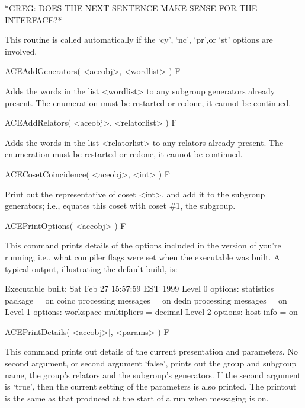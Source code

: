 *GREG: DOES THE NEXT SENTENCE MAKE SENSE FOR THE INTERFACE?*

This routine is  called automatically if the `cy',  `nc', `pr',or `st'
options are involved.


\>ACEAddGenerators( <aceobj>, <wordlist> ) F

Adds the words in the list <wordlist> to any subgroup generators already
present.
The enumeration must be restarted or redone, it cannot be continued.

\>ACEAddRelators( <aceobj>, <relatorlist> ) F

Adds the words in the list <relatorlist> to any relators already present.
The enumeration must be restarted or redone, it cannot be continued.

\>ACECosetCoincidence( <aceobj>, <int> ) F

Print out the representative of coset <int>, and add it to the
subgroup generators; i.e., equates this coset with coset \#1, the
subgroup.



% 

\>ACEPrintOptions( <aceobj> ) F

This command prints details of the options included  in the version of
{\ACE} you're  running; i.e.,  what compiler flags  were set  when the
executable  was built.   A  typical output,  illustrating the  default
build, is:

\begintt
Executable built:
  Sat Feb 27 15:57:59 EST 1999
Level 0 options:
  statistics package = on
  coinc processing messages = on
  dedn processing messages = on
Level 1 options:
  workspace multipliers = decimal
Level 2 options:
  host info = on
\endtt


\>ACEPrintDetails( <aceobj>[, <params> ) F

This  command  prints out  details  of  the  current presentation  and
parameters.  No second argument, or second argument `false', prints out
the group
and subgroup name, the group's relators and the subgroup's generators.
If the second argument is `true', then  the current setting of the
parameters is
also printed.  The printout is the  same as that produced at the start
of a run when messaging is on.

